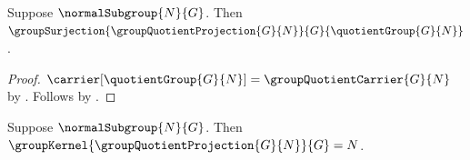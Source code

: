 \begin{corollary}\label{group_quotient_projection_group_surjection}
    Suppose $\normalSubgroup{N}{G}$.
    Then
        $\groupSurjection
            {\groupQuotientProjection{G}{N}}
            {G}{\quotientGroup{G}{N}}$.
\end{corollary}
\begin{proof}
    $\carrier[\quotientGroup{G}{N}]=
        \groupQuotientCarrier{G}{N}$ by
        .
    Follows by
        .
\end{proof}

\begin{theorem}\label{group_quotient_projection_kernel}
    Suppose $\normalSubgroup{N}{G}$.
    Then
        $\groupKernel{\groupQuotientProjection{G}{N}}{G}=N$.
\end{theorem}

